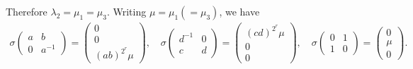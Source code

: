 Therefore $\lambda_2 = \mu_1 = \mu_3$. Writing $\mu = \mu_1 (= \mu_3)$, we have
\begin{align*}
\sigma\left(\begin{matrix}a & b\\0 & a^{-1}\end{matrix}\right) = \left(\begin{matrix}0 \\ 0 \\ (ab)^{2^r}\mu\end{matrix}\right),\quad
\sigma\left(\begin{matrix}d^{-1} & 0\\c & d\end{matrix}\right) = \left(\begin{matrix}(cd)^{2^r}\mu \\ 0 \\ 0\end{matrix}\right),\quad
\sigma\left(\begin{matrix}0 & 1\\1 & 0\end{matrix}\right) = \left(\begin{matrix}0 \\ \mu \\ 0\end{matrix}\right).
\end{align*}

